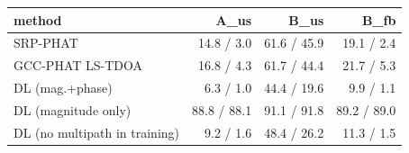 \begin{tabular}{lrrr}
\toprule
method & A\_us & B\_us & B\_fb\\
\midrule
SRP-PHAT & 14.8 / 3.0 & 61.6 / 45.9 & 19.1 / 2.4 \\
GCC-PHAT LS-TDOA & 16.8 / 4.3 & 61.7 / 44.4 & 21.7 / 5.3 \\
DL (mag.+phase) & 6.3 / 1.0 & 44.4 / 19.6 & 9.9 / 1.1 \\
DL (magnitude only) & 88.8 / 88.1 & 91.1 / 91.8 & 89.2 / 89.0 \\
DL (no multipath in training) & 9.2 / 1.6 & 48.4 / 26.2 & 11.3 / 1.5 \\
\bottomrule
\end{tabular}
